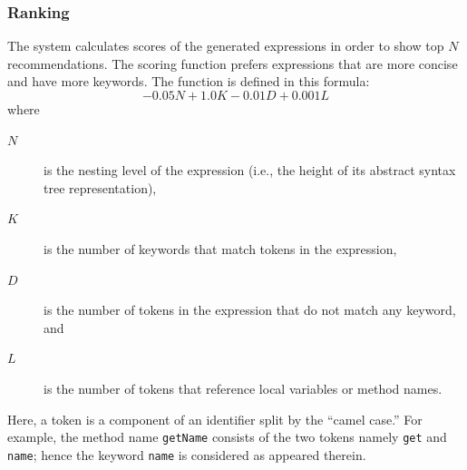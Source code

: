 \documentclass[PRO,english]{ipsj}
\begin{document}




\subsubsection{Ranking}
\label{subsubsection:Ranking}

The system calculates scores of the generated expressions in order to show top $N$ recommendations.  The scoring function prefers expressions that are more concise and have more keywords.  The function is defined in this formula:
\begin{equation}
  - 0.05 N + 1.0 K  -0.01 D + 0.001 L \label{eq:scoring}
\end{equation}
where
\begin{description}
\item[$N$] is the nesting level of the expression (i.e., the height of its abstract syntax tree representation),
\item[$K$] is the number of keywords that match tokens in the expression,
\item[$D$] is the number of tokens in the expression that do not match any keyword, and
\item[$L$] is the number of tokens that reference local variables or method names.
\end{description}
Here, a token is a component of an identifier split by the ``camel case.''  For example, the method name \texttt{getName} consists of the two tokens namely \texttt{get} and \texttt{name}; hence the keyword \texttt{name} is considered as appeared therein.
\end{document}
